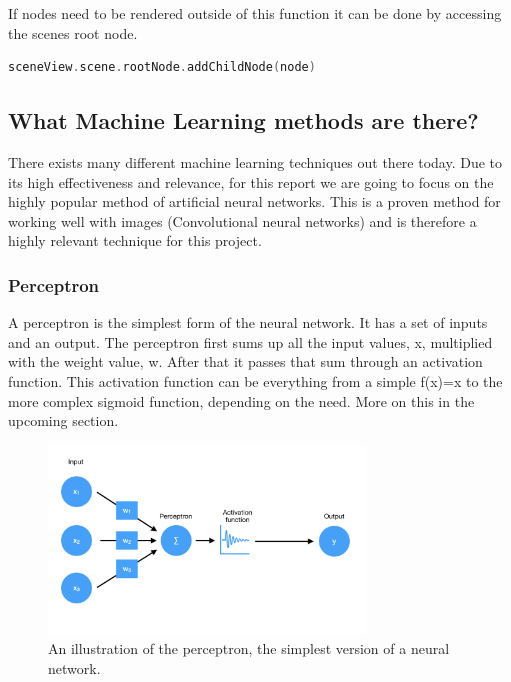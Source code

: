 If nodes need to be rendered outside of this function it can be done by accessing the
scenes root node.

\begin{lstlisting}[language=swift]
sceneView.scene.rootNode.addChildNode(node)
\end{lstlisting}

\subsection{What Machine Learning methods are there?}
There exists many different machine learning techniques out there today. Due to its high effectiveness and relevance, for this report we are going to focus on the highly popular method of artificial neural networks.
This is a proven method for working well with images (Convolutional neural networks) and is therefore a highly 
relevant technique for this project.

\subsubsection{Perceptron}
A perceptron is the simplest form of the neural network. It has a set of inputs and an output.
The perceptron first sums up all the input values, x, multiplied with the weight value, w.
After that it passes that sum through an activation function. This activation function can be everything from a simple f(x)=x to the more complex sigmoid function, depending on the need. More on this in the upcoming section.

\begin{figure}[hbtp]
\begin{center}
\includegraphics[width = 0.75\textwidth]{./Images/perceptron.jpg} 
\caption{An illustration of the perceptron, the simplest version of a neural network.}
\end{center}
\end{figure}


